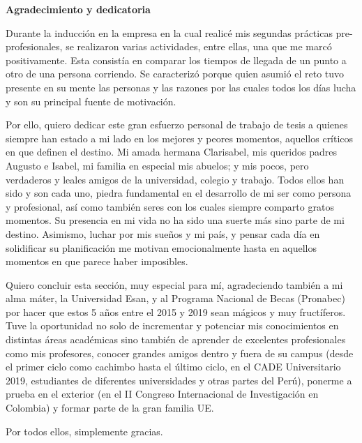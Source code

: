 \thispagestyle{plain}
\begin{center}
	{\Large \bfseries  Agradecimiento y dedicatoria}
\end{center}
\vspace{0.5cm}

Durante la inducción en la empresa en la cual realicé mis segundas prácticas pre-profesionales, se realizaron varias actividades, entre ellas, una que me marcó positivamente. Esta consistía en comparar los tiempos de llegada de un punto a otro de una persona corriendo. Se caracterizó porque quien asumió el reto tuvo presente en su mente las personas y las razones por las cuales todos los días lucha y son su principal fuente de motivación.

Por ello, quiero dedicar este gran esfuerzo personal de trabajo de tesis a quienes siempre han estado a mi lado en los mejores y peores momentos, aquellos críticos en que definen el destino. Mi amada hermana Clarisabel, mis queridos padres Augusto e Isabel, mi familia en especial mis abuelos; y mis pocos, pero verdaderos y leales amigos de la universidad, colegio y trabajo. Todos ellos han sido y son cada uno, piedra fundamental en el desarrollo de mi ser como persona y profesional, así como también seres con los cuales siempre comparto gratos momentos. Su presencia en mi vida no ha sido una suerte más sino parte de mi destino.
Asimismo, luchar por mis sueños y mi país, y pensar cada día en solidificar su planificación me motivan emocionalmente hasta en aquellos momentos en que parece haber imposibles.

Quiero concluir esta sección, muy especial para mí, agradeciendo también a mi alma máter, la Universidad Esan, y al Programa Nacional de Becas (Pronabec) por hacer que estos 5 años entre el 2015 y 2019 sean mágicos y muy fructíferos. Tuve la oportunidad no solo de incrementar y potenciar mis conocimientos en distintas áreas académicas sino también de aprender de excelentes profesionales como mis profesores, conocer grandes amigos dentro y fuera de su campus (desde el primer ciclo como cachimbo hasta el último ciclo, en el CADE Universitario 2019, estudiantes de diferentes universidades y otras partes del Perú), ponerme a prueba en el exterior (en el II Congreso Internacional de Investigación en Colombia) y formar parte de la gran familia UE.

Por todos ellos, simplemente gracias.
\newline

